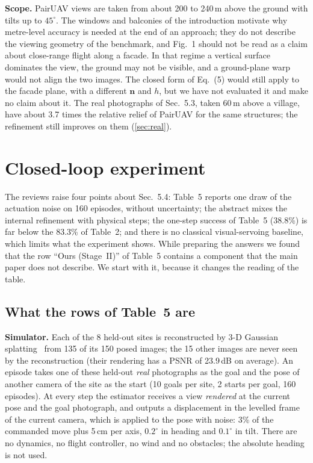 \documentclass[10pt,twocolumn,letterpaper]{article}
\begin{document}
\noindent\textbf{Scope.} PairUAV views are taken from about 200 to 240\,m above the ground with tilts up to $45^\circ$. The windows and balconies of the introduction motivate why metre-level accuracy is needed at the end of an approach; they do not describe the viewing geometry of the benchmark, and Fig.~1 should not be read as a claim about close-range flight along a facade. In that regime a vertical surface dominates the view, the ground may not be visible, and a ground-plane warp would not align the two images. The closed form of Eq.~(5) would still apply to the facade plane, with a different $\mathbf{n}$ and $h$, but we have not evaluated it and make no claim about it. The real photographs of Sec.~5.3, taken 60\,m above a village, have about 3.7 times the relative relief of PairUAV for the same structures; the refinement still improves on them (\cref{sec:real}).

\section{Closed-loop experiment}
\label{sec:closedloop}

The reviews raise four points about Sec.~5.4: Table~5 reports one draw of the actuation noise on 160 episodes, without uncertainty; the abstract mixes the internal refinement with physical steps; the one-step success of Table~5 (38.8\%) is far below the 83.3\% of Table~2; and there is no classical visual-servoing baseline, which limits what the experiment shows. While preparing the answers we found that the row ``Ours (Stage~II)'' of Table~5 contains a component that the main paper does not describe. We start with it, because it changes the reading of the table.

\subsection{What the rows of Table~5 are}
\label{sec:tablefive}

\noindent\textbf{Simulator.} Each of the 8 held-out sites is reconstructed by 3-D Gaussian splatting~\cite{kerbl20233d,ye2025gsplat} from 135 of its 150 posed images; the 15 other images are never seen by the reconstruction (their rendering has a PSNR of 23.9\,dB on average). An episode takes one of these held-out \emph{real} photographs as the goal and the pose of another camera of the site as the start (10 goals per site, 2 starts per goal, 160 episodes). At every step the estimator receives a view \emph{rendered} at the current pose and the goal photograph, and outputs a displacement in the levelled frame of the current camera, which is applied to the pose with noise: 3\% of the commanded move plus 5\,cm per axis, $0.2^\circ$ in heading and $0.1^\circ$ in tilt. There are no dynamics, no flight controller, no wind and no obstacles; the absolute heading is not used.
\end{document}
